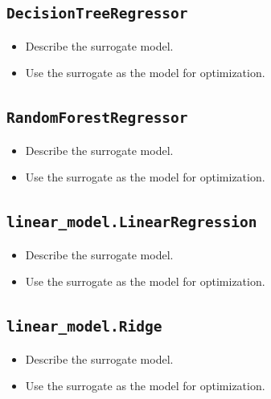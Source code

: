 \documentclass[
  letterpaper,
  DIV=11,
  numbers=noendperiod]{scrreprt}
\providecommand{\tightlist}{%
  \setlength{\itemsep}{0pt}\setlength{\parskip}{0pt}}\usepackage{longtable,booktabs,array}
\begin{document}
\hypertarget{decisiontreeregressor}{%
\subsection{\texorpdfstring{\texttt{DecisionTreeRegressor}}{DecisionTreeRegressor}}\label{decisiontreeregressor}}

\begin{itemize}
\tightlist
\item
  Describe the surrogate model.
\item
  Use the surrogate as the model for optimization.
\end{itemize}

\hypertarget{randomforestregressor}{%
\subsection{\texorpdfstring{\texttt{RandomForestRegressor}}{RandomForestRegressor}}\label{randomforestregressor}}

\begin{itemize}
\tightlist
\item
  Describe the surrogate model.
\item
  Use the surrogate as the model for optimization.
\end{itemize}

\hypertarget{linear_model.linearregression}{%
\subsection{\texorpdfstring{\texttt{linear\_model.LinearRegression}}{linear\_model.LinearRegression}}\label{linear_model.linearregression}}

\begin{itemize}
\tightlist
\item
  Describe the surrogate model.
\item
  Use the surrogate as the model for optimization.
\end{itemize}

\hypertarget{linear_model.ridge}{%
\subsection{\texorpdfstring{\texttt{linear\_model.Ridge}}{linear\_model.Ridge}}\label{linear_model.ridge}}

\begin{itemize}
\tightlist
\item
  Describe the surrogate model.
\item
  Use the surrogate as the model for optimization.
\end{itemize}
\end{document}
